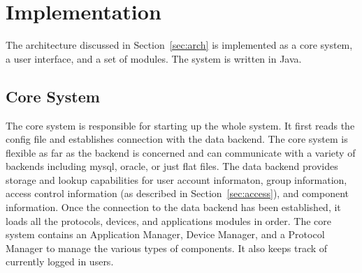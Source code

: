 \section{Implementation}
\label{sec:implementation}
The architecture discussed in Section~\ref{sec:arch} is implemented as a core
system, a user interface, and a set of modules. The system is written in Java.
\subsection{Core System}
\label{sec:core}
The core system is responsible for starting up the whole system. It first reads
the config file and establishes connection with the data backend. The core
system is flexible as far as the backend is concerned and can communicate with
a variety of backends including mysql, oracle, or just flat files. The data
backend provides storage and lookup capabilities for user account informaton,
group information, access control information (as described in
Section~\ref{sec:access}), and component information. Once the connection to
the data backend has been established, it loads all the protocols, devices, and
applications modules in order. The core system contains an Application Manager,
Device Manager, and a Protocol Manager to manage the various types of
components. It also keeps track of currently logged in users.
